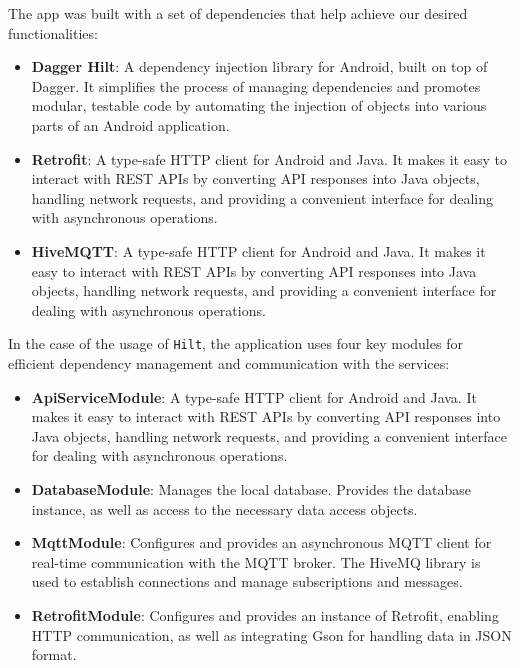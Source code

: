 \clearpage
The app was built with a set of dependencies that help achieve our desired functionalities:
\begin{itemize}
    \item \textbf{Dagger Hilt}: A dependency injection library for Android, built on top of Dagger. 
    It simplifies the process of managing dependencies and promotes modular, testable code by automating 
    the injection of objects into various parts of an Android application.
    \item \textbf{Retrofit}: A type-safe HTTP client for Android and Java. It makes it easy to interact with REST 
    APIs by converting API responses into Java objects, handling network requests, and providing a convenient 
    interface for dealing with asynchronous operations.
    \item \textbf{HiveMQTT}: A type-safe HTTP client for Android and Java. It makes it easy to interact with REST APIs 
    by converting API responses into Java objects, handling network requests, and providing a convenient interface for 
    dealing with asynchronous operations.
\end{itemize}

In the case of the usage of \texttt{Hilt}, the application uses four key modules for efficient dependency management and 
communication with the services:
\begin{itemize}
    \item \textbf{ApiServiceModule}: A type-safe HTTP client for Android and Java. It makes it easy to interact with REST APIs by converting API responses into Java objects, handling network requests, and providing a convenient interface for dealing with asynchronous operations.
    \item \textbf{DatabaseModule}: Manages the local database. Provides the database instance, as well as access to the necessary data access objects.
    \item \textbf{MqttModule}: Configures and provides an asynchronous MQTT client for real-time communication with the MQTT broker. The HiveMQ library is used to establish connections and manage subscriptions and messages. 
    \item \textbf{RetrofitModule}: Configures and provides an instance of Retrofit, enabling HTTP communication, as well as integrating Gson for handling data in JSON format. 
\end{itemize}

